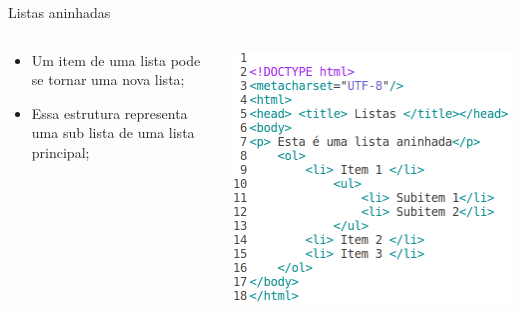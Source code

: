 \documentclass{beamer}
\begin{document}
\begin{frame}{Listas aninhadas}
  \begin{columns}
    \begin{column}{0.45 \textwidth}
     \begin{itemize}
      \item Um item de uma lista pode se tornar uma nova lista;
       \item Essa estrutura representa uma sub lista de uma lista 
principal;
     \end{itemize}
    \end{column}
    \begin{column}{0.5\textwidth}
     \includegraphics[height=0.55\paperheight]{fig/aula2/html5.png}
    \end{column}
  \end{columns}
\end{frame}
\end{document}
